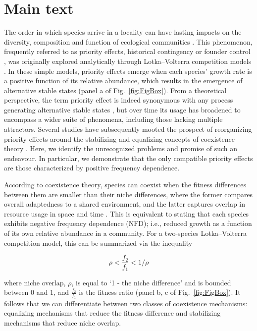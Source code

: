 \section{Main text}
The order in which species arrive in a locality can have lasting impacts on the diversity, composition and function of ecological communities \citep{Chase2003Oecologia, Fukami2015}. This phenomenon, frequently referred to as priority effects, historical contingency or founder control \citep{Slatkin1974}, was originally explored analytically through Lotka--Volterra competition models \citep{Lewontin1969, May1971}. In these simple models, priority effects emerge when each species' growth rate is a positive function of its relative abundance, which results in the emergence of alternative stable states (panel a of Fig.~\ref{fig:FigBox}). From a theoretical perspective, the term priority effect is indeed synonymous with any process generating alternative stable states \citep{Petraitis2013}, but over time its usage has broadened to encompass a wider suite of phenomena, including those lacking multiple attractors. Several studies have subsequently mooted the prospect of reorganizing priority effects around the stabilizing and equalizing concepts of coexistence theory \citep{Mordecai2011, Fukami2016, Letten2017}. Here, we identify the unrecognized problems and promise of such an endeavour. In particular, we demonstrate that the only compatible priority effects are those characterized by positive frequency dependence. 
\par 


According to coexistence theory, species can coexist when the fitness differences between them are smaller than their niche differences, where the former compares overall adaptedness to a shared environment, and the latter captures overlap in resource usage in space and time \citep{Chesson2000}. This is equivalent to stating that each species exhibits negative frequency dependence (NFD); i.e., reduced growth as a function of its own relative abundance in a community. For a two-species Lotka--Volterra competition model, this can be summarized via the inequality 

\begin{equation}
\rho < \frac{f_{2}}{f_{1}} < 1/\rho
\tag{3.1}\label{eq:3.1}
\end{equation}

\noindent where niche overlap, $\rho$, is equal to `1 - the niche difference' and is bounded between 0 and 1, and $\frac{f_{2}}{f_{1}}$ is the fitness ratio (panel b, c of Fig.~\ref{fig:FigBox}). It follows that we can differentiate between two classes of coexistence mechanisms: equalizing mechanisms that reduce the fitness difference and stabilizing mechanisms that reduce niche overlap. 
\par


